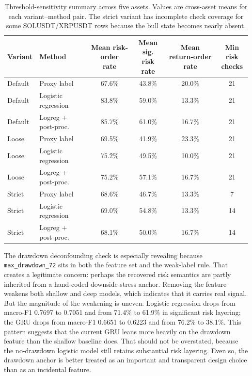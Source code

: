 \documentclass[a4paper,fleqn]{cas-dc}
\begin{document}
\begin{table}[t]
\caption{Threshold-sensitivity summary across five assets. Values are cross-asset means for each variant--method pair. The strict variant has incomplete check coverage for some SOLUSDT/XRPUSDT rows because the bull state becomes nearly absent.}
\label{tab:threshold-sensitivity}
\centering
\scriptsize
\setlength{\tabcolsep}{4pt}
\begin{tabular}{llcccc}
\toprule
Variant & Method & \shortstack{Mean risk-order\\rate} & \shortstack{Mean sig.\\risk rate} & \shortstack{Mean return-order\\rate} & \shortstack{Min risk\\checks} \\
\midrule
Default & Proxy label & 67.6\% & 43.8\% & 20.0\% & 21 \\
Default & Logistic regression & 83.8\% & 59.0\% & 13.3\% & 21 \\
Default & Logreg + post-proc. & 85.7\% & 61.0\% & 16.7\% & 21 \\
\midrule
Loose & Proxy label & 69.5\% & 41.9\% & 23.3\% & 21 \\
Loose & Logistic regression & 75.2\% & 49.5\% & 10.0\% & 21 \\
Loose & Logreg + post-proc. & 75.2\% & 57.1\% & 16.7\% & 21 \\
\midrule
Strict & Proxy label & 68.6\% & 46.7\% & 13.3\% & 7 \\
Strict & Logistic regression & 69.0\% & 54.8\% & 13.3\% & 14 \\
Strict & Logreg + post-proc. & 68.1\% & 50.0\% & 16.7\% & 14 \\
\bottomrule
\end{tabular}
\end{table}

The drawdown deconfounding check is especially revealing because \texttt{max\_drawdown\_72} sits in both the feature set and the weak-label rule. That creates a legitimate concern: perhaps the recovered risk semantics are partly inherited from a hand-coded downside-stress anchor. Removing the feature weakens both shallow and deep models, which indicates that it carries real signal. But the magnitude of the weakening is uneven. Logistic regression drops from macro-F1 0.7697 to 0.7051 and from 71.4\% to 61.9\% in significant risk layering; the GRU drops from macro-F1 0.6651 to 0.6223 and from 76.2\% to 38.1\%. This pattern suggests that the current GRU leans more heavily on the drawdown feature than the shallow baseline does. That should not be overstated, because the no-drawdown logistic model still retains substantial risk layering. Even so, the drawdown anchor is better treated as an important and transparent design choice than as an incidental feature.
\end{document}
